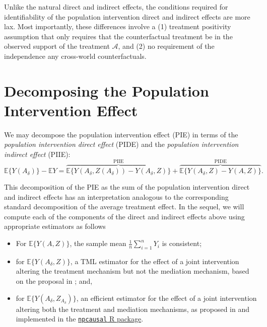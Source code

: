 \documentclass[12pt, krantz2,]{krantz}
\newcommand{\passthrough}[1]{#1}
\providecommand{\tightlist}{%
  \setlength{\itemsep}{0pt}\setlength{\parskip}{0pt}}
\theoremstyle{definition}
\theoremstyle{definition}
\theoremstyle{definition}
\newcommand{\1}{\mathbbm{1}}
\begin{document}
Unlike the natural direct and indirect effects, the conditions required for
identifiability of the population intervention direct and indirect effects are
more lax. Most importantly, these differences involve a (1) treatment positivity
assumption that only requires that the counterfactual treatment be in the
observed support of the treatment \(\mathcal{A}\), and (2) no requirement of the
independence any cross-world counterfactuals.

\hypertarget{decomposing-the-population-intervention-effect}{%
\section{Decomposing the Population Intervention Effect}\label{decomposing-the-population-intervention-effect}}

We may decompose the population intervention effect (PIE) in terms of the
\emph{population intervention direct effect} (PIDE) and the \emph{population
intervention indirect effect} (PIIE):
\begin{equation*}
  \mathbb{E}\{Y(A_\delta)\} - \mathbb{E}Y =
    \overbrace{\mathbb{E}\{Y(A_\delta, Z(A_\delta))
      - Y(A_\delta, Z)\}}^{\text{PIIE}} +
    \overbrace{\mathbb{E}\{Y(A_\delta, Z) - Y(A, Z)\}}^{\text{PIDE}}.
\end{equation*}

This decomposition of the PIE as the sum of the population intervention direct
and indirect effects has an interpretation analogous to the corresponding
standard decomposition of the average treatment effect. In the sequel, we will
compute each of the components of the direct and indirect effects above using
appropriate estimators as follows

\begin{itemize}
\tightlist
\item
  For \(\mathbb{E}\{Y(A, Z)\}\), the sample mean \(\frac{1}{n}\sum_{i=1}^n Y_i\) is
  consistent;
\item
  for \(\mathbb{E}\{Y(A_{\delta}, Z)\}\), a TML estimator for the effect of a
  joint intervention altering the treatment mechanism but not the mediation
  mechanism, based on the proposal in \citet{diaz2020causal}; and,
\item
  for \(\mathbb{E}\{Y(A_{\delta}, Z_{A_{\delta}})\}\), an efficient estimator for
  the effect of a joint intervention altering both the treatment and mediation
  mechanisms, as proposed in \citet{kennedy2017nonparametric} and implemented in the
  \href{https://github.com/ehkennedy/npcausal}{\passthrough{\lstinline!npcausal!} R package}.
\end{itemize}
\end{document}
